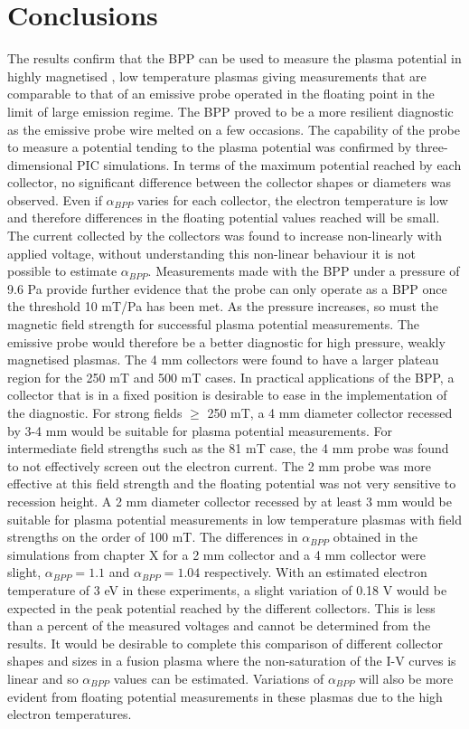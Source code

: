 \section{Conclusions}
The results confirm that the BPP can be used to measure the plasma potential in highly magnetised , low temperature plasmas giving measurements that are comparable to that of an emissive probe operated in the  floating point in the limit of large emission regime. The BPP proved to be a more resilient diagnostic as the emissive probe wire melted on a few occasions. The capability of the probe to measure a potential tending to the plasma potential was confirmed by three-dimensional PIC simulations. In terms of the maximum potential reached by each collector, no significant difference between the collector shapes or diameters was observed. Even if $\alpha_{BPP}$ varies for each collector, the electron temperature is low and therefore differences in the floating potential values reached will be small. The current collected by the collectors was found to increase non-linearly with applied voltage, without understanding this non-linear behaviour it is not possible to estimate $\alpha_{BPP}$.  
Measurements made with the BPP under a pressure of 9.6 Pa provide further evidence that the probe can only operate as a BPP once the threshold 10 mT/Pa has been met. As the pressure increases, so must the magnetic field strength for successful plasma potential measurements. The emissive probe would therefore be a better diagnostic for high pressure, weakly magnetised plasmas. 
The 4 mm collectors were found to have a larger plateau region for the 250 mT and 500 mT cases. In practical applications of the BPP, a collector that is in a fixed position is desirable to ease in the implementation of the diagnostic. For strong fields $\geq$ 250 mT, a 4 mm diameter collector recessed by 3-4 mm would be suitable for plasma potential measurements. For intermediate field strengths such as the 81 mT case, the 4 mm probe was found to not effectively screen out the electron current. The 2 mm probe was more effective at this field strength and the floating potential was not very sensitive to recession height. A 2 mm diameter collector recessed by at least 3 mm would be suitable for plasma potential measurements in low temperature plasmas with field strengths on the order of 100 mT.
The differences in $\alpha_{BPP}$ obtained in the simulations from chapter X for a 2 mm collector and a 4 mm collector were slight, $\alpha_{BPP} = 1.1$ and $ \alpha_{BPP} = 1.04$ respectively. With an estimated electron temperature of 3 eV in these experiments, a slight variation of 0.18 V would be expected in the peak potential reached by the different collectors. This is less than a percent of the measured voltages and cannot be determined from the results. It would be desirable to complete this comparison of different collector shapes and sizes in a fusion plasma where the non-saturation of the I-V curves is linear and so $\alpha_{BPP}$ values can be estimated. Variations of $\alpha_{BPP}$ will also be more evident from floating potential measurements in these plasmas due to the high electron temperatures. 
